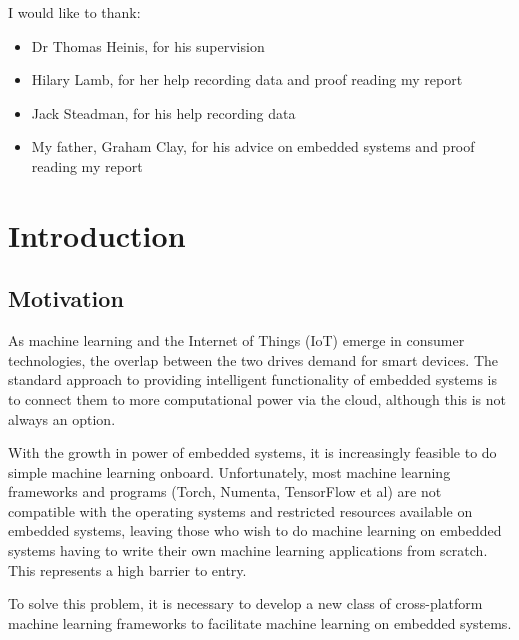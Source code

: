 \documentclass[a4paper]{article}
\begin{document}
I would like to thank:

\begin{itemize}
\item Dr Thomas Heinis, for his supervision
\item Hilary Lamb, for her help recording data and proof reading my report
\item Jack Steadman, for his help recording data
\item My father, Graham Clay, for his advice on embedded systems and proof reading my report
\end{itemize}


\pagebreak
\tableofcontents
\pagebreak


\newpage
\section{Introduction}
\label{sec:in}

\subsection{Motivation}%
\label{subsec:in_motivation}

As machine learning and the Internet of Things (IoT) emerge in consumer technologies, the overlap between the two drives demand for smart devices. The standard approach to providing intelligent functionality of embedded systems is to connect them to more computational power via the cloud, although this is not always an option.

With the growth in power of embedded systems, it is increasingly feasible to do simple machine learning onboard. Unfortunately, most machine learning frameworks and programs (Torch, Numenta, TensorFlow et al) are not compatible with the operating systems and restricted resources available on embedded systems, leaving those who wish to do machine learning on embedded systems having to write their own machine learning applications from scratch. This represents a high barrier to entry.

To solve this problem, it is necessary to develop a new class of cross-platform machine learning frameworks to facilitate machine learning on embedded systems.
\end{document}
